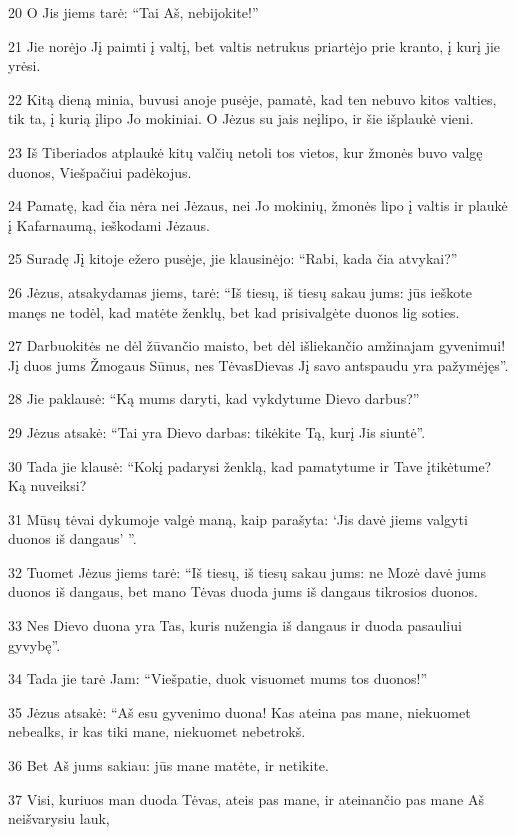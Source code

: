 \par 20 O Jis jiems tarė: “Tai Aš, nebijokite!” 
\par 21 Jie norėjo Jį paimti į valtį, bet valtis netrukus priartėjo prie kranto, į kurį jie yrėsi. 
\par 22 Kitą dieną minia, buvusi anoje pusėje, pamatė, kad ten nebuvo kitos valties, tik ta, į kurią įlipo Jo mokiniai. O Jėzus su jais neįlipo, ir šie išplaukė vieni. 
\par 23 Iš Tiberiados atplaukė kitų valčių netoli tos vietos, kur žmonės buvo valgę duonos, Viešpačiui padėkojus. 
\par 24 Pamatę, kad čia nėra nei Jėzaus, nei Jo mokinių, žmonės lipo į valtis ir plaukė į Kafarnaumą, ieškodami Jėzaus. 
\par 25 Suradę Jį kitoje ežero pusėje, jie klausinėjo: “Rabi, kada čia atvykai?” 
\par 26 Jėzus, atsakydamas jiems, tarė: “Iš tiesų, iš tiesų sakau jums: jūs ieškote manęs ne todėl, kad matėte ženklų, bet kad prisivalgėte duonos lig soties. 
\par 27 Darbuokitės ne dėl žūvančio maisto, bet dėl išliekančio amžinajam gyvenimui! Jį duos jums Žmogaus Sūnus, nes Tėvas­Dievas Jį savo antspaudu yra pažymėjęs”. 
\par 28 Jie paklausė: “Ką mums daryti, kad vykdytume Dievo darbus?” 
\par 29 Jėzus atsakė: “Tai yra Dievo darbas: tikėkite Tą, kurį Jis siuntė”. 
\par 30 Tada jie klausė: “Kokį padarysi ženklą, kad pamatytume ir Tave įtikėtume? Ką nuveiksi? 
\par 31 Mūsų tėvai dykumoje valgė maną, kaip parašyta: ‘Jis davė jiems valgyti duonos iš dangaus’ ”. 
\par 32 Tuomet Jėzus jiems tarė: “Iš tiesų, iš tiesų sakau jums: ne Mozė davė jums duonos iš dangaus, bet mano Tėvas duoda jums iš dangaus tikrosios duonos. 
\par 33 Nes Dievo duona yra Tas, kuris nužengia iš dangaus ir duoda pasauliui gyvybę”. 
\par 34 Tada jie tarė Jam: “Viešpatie, duok visuomet mums tos duonos!” 
\par 35 Jėzus atsakė: “Aš esu gyvenimo duona! Kas ateina pas mane, niekuomet nebealks, ir kas tiki mane, niekuomet nebetrokš. 
\par 36 Bet Aš jums sakiau: jūs mane matėte, ir netikite. 
\par 37 Visi, kuriuos man duoda Tėvas, ateis pas mane, ir ateinančio pas mane Aš neišvarysiu lauk, 
